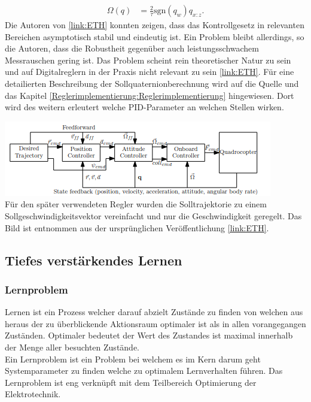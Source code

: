 \begin{align}
	\Omega(q) &= \frac{2}{\tau}\text{sgn}(q_{w})q_{x:z}.
\end{align}
Die Autoren von \ref{link:ETH} konnten zeigen, dass das Kontrollgesetz in relevanten Bereichen asymptotisch stabil und eindeutig ist. Ein Problem bleibt allerdings, so die Autoren, dass die Robustheit gegenüber auch leistungsschwachem Messrauschen gering ist. Das Problem scheint rein theoretischer Natur zu sein und auf Digitalreglern in der Praxis nicht relevant zu sein \ref{link:ETH}. Für eine detailierten Beschreibung der Sollquaternionberechnung wird auf die Quelle und das Kapitel \ref{Reglerimplementierung:Reglerimplementierung} hingewiesen. Dort wird des weitern erleutert welche PID-Parameter an welchen Stellen wirken.
\begin{center}
	\includegraphics[scale=0.78]{../images/0001 Quadcopterregler.png}{\\Für den später verwendeten Regler wurden die Solltrajektorie zu einem Sollgeschwindigkeitsvektor vereinfacht und nur die Geschwindigkeit geregelt. Das Bild ist entnommen aus der ursprünglichen Veröffentlichung \ref{link:ETH}.}
\end{center}


\subsection{Tiefes verstärkendes Lernen}

\subsubsection{Lernproblem}
Lernen ist ein Prozess welcher darauf abzielt Zustände zu finden von welchen aus heraus der zu überblickende Aktionsraum optimaler ist als in allen vorangegangen Zuständen. 
Optimaler bedeutet der Wert des Zustandes ist maximal innerhalb der Menge aller besuchten Zustände.\\
Ein Lernproblem ist ein Problem bei welchem es im Kern darum geht Systemparameter zu finden welche zu optimalem Lernverhalten führen. 
Das Lernproblem ist eng verknüpft mit dem Teilbereich Optimierung der Elektrotechnik. 


